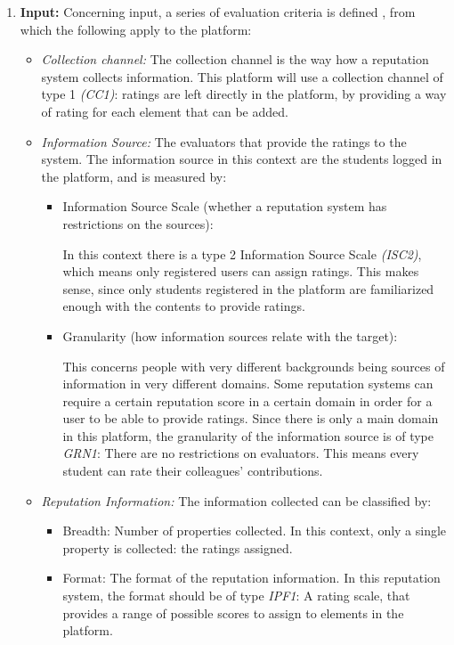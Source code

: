 \begin{enumerate}
\item \textbf{Input:}
Concerning input, a series of evaluation criteria is defined \cite{liu2010evaluation}, from which the following apply to the platform:

\begin{itemize}
\item \textit{Collection channel:} The collection channel is the way how a reputation system collects information. This platform will use a collection channel of type 1 \textit{(CC1)}: ratings are left directly in the platform, by providing a way of rating for each element that can be added.

\item \textit{Information Source:} The evaluators that provide the ratings to the system. The information source in this context are the students logged in the platform, and is measured by:
\begin{itemize} %
\item Information Source Scale (whether a reputation system has restrictions on the sources):

In this context there is a type 2 Information Source Scale \textit{(ISC2)}, which means only registered users can assign ratings. This makes sense, since only students registered in the platform are familiarized enough with the contents to provide ratings.

\item Granularity (how information sources relate with the target):

This concerns people with very different backgrounds being sources of information in very different domains. Some reputation systems can require a certain reputation score in a certain domain in order for a user to be able to provide ratings. Since there is only a main domain in this platform, the granularity of the information source is of type \textit{GRN1}: There are no restrictions on evaluators. This means every student can rate their colleagues' contributions.
\end{itemize} %
\item \textit{Reputation Information:} The information collected can be classified by:
\begin{itemize} %
\item Breadth: Number of properties collected. In this context, only a single property is collected: the ratings assigned.
\item Format: The format of the reputation information. In this reputation system, the format should be of type \textit{IPF1}: A rating scale, that provides a range of possible scores to assign to elements in the platform.
\end{itemize} %
	

\end{itemize}
\end{enumerate}
